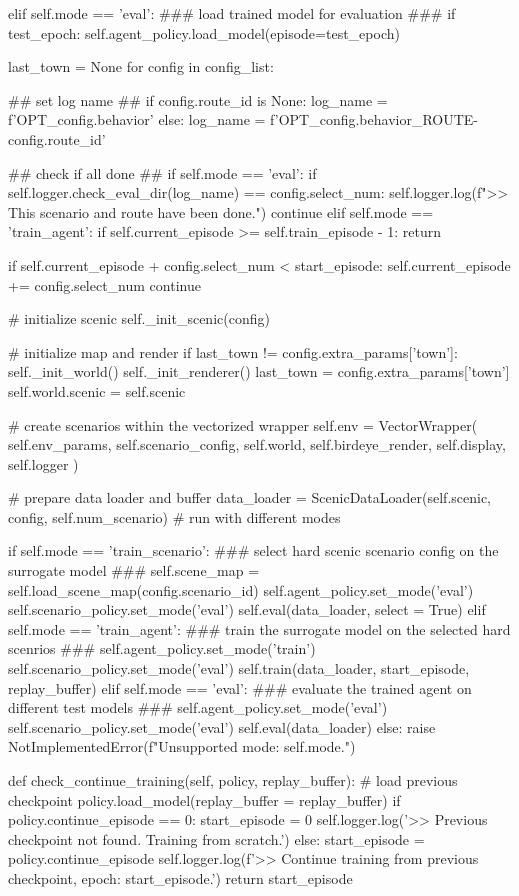 \begin{appendix}
elif self.mode == 'eval':
\#\#\# load trained model for evaluation \#\#\#
if test\_epoch:
self.agent\_policy.load\_model(episode=test\_epoch)

last\_town = None
for config in config\_list:

\#\# set log name \#\#
if config.route\_id is None:
log\_name = f'OPT\_{config.behavior}'
else:
log\_name = f'OPT\_{config.behavior}\_ROUTE-{config.route\_id}'

\#\# check if all done \#\#
if self.mode == 'eval':
if self.logger.check\_eval\_dir(log\_name) == config.select\_num:
self.logger.log(f">> This scenario and route have been done.")
continue
elif self.mode == 'train\_agent': 
if self.current\_episode >= self.train\_episode - 1:
return

if self.current\_episode + config.select\_num < start\_episode:
self.current\_episode += config.select\_num
continue

\# initialize scenic
self.\_init\_scenic(config)

\# initialize map and render
if last\_town != config.extra\_params['town']:
self.\_init\_world()
self.\_init\_renderer()
last\_town = config.extra\_params['town']
self.world.scenic = self.scenic

\# create scenarios within the vectorized wrapper
self.env = VectorWrapper(
self.env\_params, 
self.scenario\_config, 
self.world, 
self.birdeye\_render, 
self.display, 
self.logger
)

\# prepare data loader and buffer
data\_loader = ScenicDataLoader(self.scenic, config, self.num\_scenario)
\# run with different modes

if self.mode == 'train\_scenario':
\#\#\# select hard scenic scenario config on the surrogate model \#\#\#
self.scene\_map = self.load\_scene\_map(config.scenario\_id)
self.agent\_policy.set\_mode('eval')
self.scenario\_policy.set\_mode('eval')
self.eval(data\_loader, select = True)
elif self.mode == 'train\_agent':
\#\#\# train the surrogate model on the selected hard scenrios \#\#\#
self.agent\_policy.set\_mode('train')
self.scenario\_policy.set\_mode('eval')
self.train(data\_loader, start\_episode, replay\_buffer)
elif self.mode == 'eval':
\#\#\# evaluate the trained agent on different test models \#\#\#
self.agent\_policy.set\_mode('eval')
self.scenario\_policy.set\_mode('eval')
self.eval(data\_loader)
else:
raise NotImplementedError(f"Unsupported mode: {self.mode}.")

def check\_continue\_training(self, policy, replay\_buffer):
\# load previous checkpoint
policy.load\_model(replay\_buffer = replay\_buffer)
if policy.continue\_episode == 0:
start\_episode = 0
self.logger.log('>> Previous checkpoint not found. Training from scratch.')
else:
start\_episode = policy.continue\_episode
self.logger.log(f'>> Continue training from previous checkpoint, epoch: {start\_episode}.')
return start\_episode


\end{appendix}
